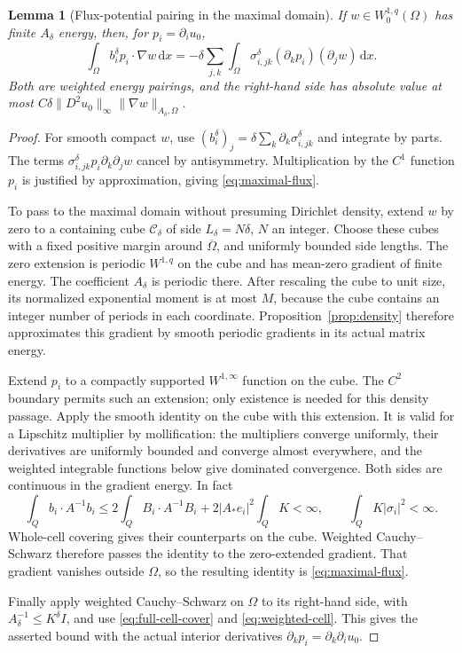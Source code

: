 \documentclass[11pt,a4paper]{article}
\numberwithin{equation}{section}
\newtheorem{lemma}[theorem]{Lemma}
\theoremstyle{definition}
\theoremstyle{remark}\newtheorem{remark}[theorem]{Remark}
\newcommand{\Id}{I}
\newcommand{\dd}{\,\mathrm dx}
\newcommand{\norm}[1]{\lVert #1\rVert}
\begin{document}
\begin{lemma}[Flux-potential pairing in the maximal domain]
\label{lem:maximal-flux}
If \(w\in W^{1,q}_0(\Omega)\) has finite \(A_\delta\) energy,
then, for \(p_i=\partial_i u_0\),
\begin{equation}\label{eq:maximal-flux}
 \int_\Omega b_i^\delta p_i\cdot\nabla w\dd
 =-\delta\sum_{j,k}\int_\Omega
       \sigma_{i,jk}^\delta(\partial_k p_i)(\partial_j w)\dd.
\end{equation}
Both are weighted energy pairings, and the right-hand side has
absolute value at most
\(C\delta\norm{D^2u_0}_\infty\norm{\nabla w}_{A_\delta,\Omega}\).
\end{lemma}
\begin{proof}
For smooth compact \(w\), use
\((b_i^\delta)_j=\delta\sum_k\partial_k\sigma_{i,jk}^\delta\)
and integrate by parts. The terms
\(\sigma_{i,jk}^\delta p_i\partial_k\partial_jw\)
cancel by antisymmetry. Multiplication by the \(C^1\) function
\(p_i\) is justified by approximation, giving
\eqref{eq:maximal-flux}.

To pass to the maximal domain without presuming Dirichlet density,
extend \(w\) by zero to a containing cube
\(\mathcal C_\delta\) of side \(L_\delta=N\delta\), \(N\) an
integer. Choose these cubes with a fixed positive margin around
\(\overline\Omega\), and uniformly bounded side lengths.
The zero extension is periodic \(W^{1,q}\) on the cube and has
mean-zero gradient of finite energy. The coefficient \(A_\delta\)
is periodic there. After rescaling the cube to unit size, its
normalized exponential moment is at most \(M\), because the cube
contains an integer number of periods in each coordinate.
Proposition~\ref{prop:density} therefore approximates this
gradient by smooth periodic gradients in its actual matrix energy.

Extend \(p_i\) to a compactly supported \(W^{1,\infty}\) function
on the cube. The \(C^2\) boundary permits such an extension;
only existence is needed for this density passage.
Apply the smooth identity on the cube with this extension.
It is valid for a Lipschitz multiplier by mollification:
the multipliers converge uniformly, their derivatives are
uniformly bounded and converge almost everywhere, and the
weighted integrable functions below give dominated convergence.
Both sides are continuous in the gradient energy. In fact
\[
 \int_Q b_i\cdot A^{-1}b_i
 \leq2\int_QB_i\cdot A^{-1}B_i+
                         2|A_*e_i|^2\int_QK<\infty,
 \qquad \int_QK|\sigma_i|^2<\infty .
 \]
Whole-cell covering gives their counterparts on the cube.
Weighted Cauchy--Schwarz therefore passes the identity to the
zero-extended gradient. That gradient vanishes outside \(\Omega\),
so the resulting identity is \eqref{eq:maximal-flux}.

Finally apply weighted Cauchy--Schwarz on \(\Omega\) to its
right-hand side, with \(A_\delta^{-1}\leq K^\delta\Id\),
and use \eqref{eq:full-cell-cover} and
\eqref{eq:weighted-cell}. This gives the asserted bound with
the actual interior derivatives
\(\partial_kp_i=\partial_k\partial_i u_0\).
\end{proof}
\end{document}
